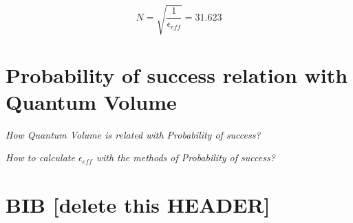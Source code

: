 \documentclass[11pt]{article}
\begin{document}
$$N = \sqrt{\frac{1}{\epsilon_{eff}}} = 31.623$$


\section{Probability of success relation with Quantum Volume}
\label{sec:org1aa4196}

\emph{How Quantum Volume is related with Probability of success?}

\emph{How to calculate \(\epsilon_{eff}\) with the methods of Probability of success?}



\section{BIB [delete this HEADER]}
\label{sec:orgedb07bb}



\end{document}
